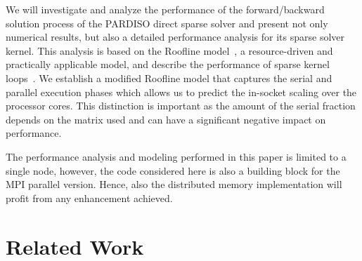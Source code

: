 We will investigate and analyze
the performance of the forward/backward solution process of 
the
PARDISO %
direct sparse solver
and present not only numerical
results, but also a detailed performance analysis for its sparse solver kernel.
This analysis is based on the Roofline model~\cite{williams-2009}, a resource-driven and
practically applicable model, and describe the performance of sparse
kernel loops~\cite{Gropp99,Williams:EECS-2008-164,KHWPAF14}.
%
We establish a modified Roofline model that captures the serial and parallel
execution phases which allows us to predict the in-socket scaling over the
processor cores.
This distinction is important as the amount of the serial fraction depends on
the matrix used and can have a significant negative impact on performance.

The performance analysis and modeling performed in this paper is limited to a
single node, however, the code considered here is also a building block for the
MPI parallel version. 
Hence, also the distributed memory implementation will profit from any
enhancement achieved.



\section*{Related Work}


